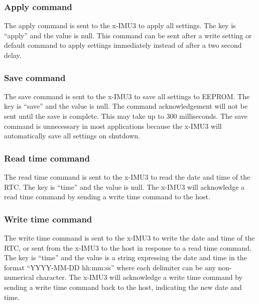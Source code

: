 \subsubsection{Apply command}

The apply command is sent to the x-IMU3 to apply all settings.  The key is \enquote{apply} and the value is null.  This command can be sent after a write setting or default command to apply settings immediately instead of after a two second delay.


\subsubsection{Save command}

The save command is sent to the x-IMU3 to save all settings to \ac{EEPROM}.  The key is \enquote{save} and the value is null.  The command acknowledgement will not be sent until the save is complete.  This may take up to 300 milliseconds.  The save command is unnecessary in most applications because the x-IMU3 will automatically save all settings on shutdown.


\subsubsection{Read time command}

The read time command is sent to the x-IMU3 to read the date and time of the \ac{RTC}.  The key is \enquote{time} and the value is null.  The x-IMU3 will acknowledge a read time command by sending a write time command to the host.


\subsubsection{Write time command}

The write time command is sent to the x-IMU3 to write the date and time of the \ac{RTC}, or sent from the x-IMU3 to the host in response to a read time command.  The key is \enquote{time} and the value is a string expressing the date and time in the format \enquote{YYYY-MM-DD hh:mm:ss} where each delimiter can be any non-numerical character.  The x-IMU3 will acknowledge a write time command by sending a write time command back to the host, indicating the new date and time.

